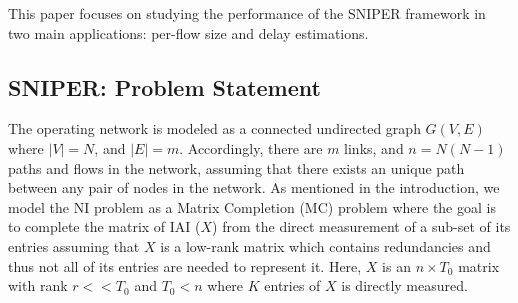This paper focuses on studying the performance of the SNIPER framework in two
main applications: per-flow size and delay estimations.

\subsection{SNIPER: Problem Statement}   \label{subsec:ProbState}
The operating network is modeled as a connected undirected graph $G(V,E)$ where $|V|=N$, and $|E|=m$. Accordingly, there are $m$ links, and $n=N(N-1)$ paths and flows in the network, assuming that there exists an unique path between any pair of nodes in the network. As mentioned in the introduction, we model the NI problem as a Matrix Completion (MC) problem where the goal is to complete the matrix of IAI ($X$) from the direct measurement of a sub-set of its entries assuming that $X$ is a low-rank matrix which contains redundancies and thus not all of its entries are needed to represent it. Here, $X$ is an $n \times T_{0}$ matrix with rank $r << T_{0}$ and $T_{0}<n$ where $K$ entries of $X$ is directly measured. 

